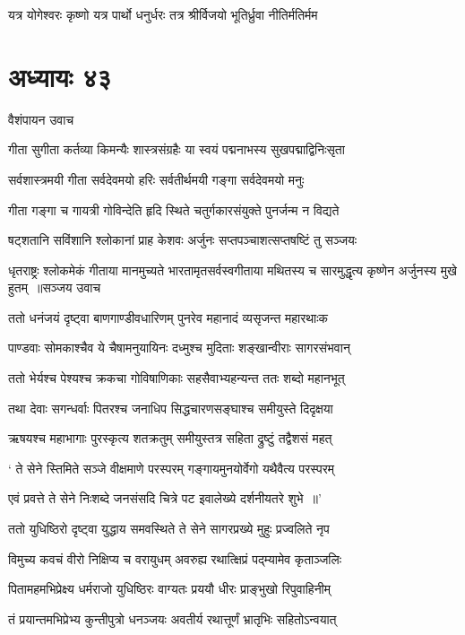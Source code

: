 \twolineshloka
{यत्र योगेश्वरः कृष्णो यत्र पार्थो धनुर्धरः}
{तत्र श्रीर्विजयो भूतिर्ध्रुवा नीतिर्मतिर्मम}


\chapter{अध्यायः ४३}
\twolineshloka
{वैशंपायन उवाच}
{}


\twolineshloka
{गीता सुगीता कर्तव्या किमन्यैः शास्त्रसंग्रहैः}
{या स्वयं पद्मनाभस्य सुखपद्माद्विनिःसृता}


\twolineshloka
{सर्वशास्त्रमयी गीता सर्वदेवमयो हरिः}
{सर्वतीर्थमयी गङ्गा सर्वदेवमयो मनुः}


\twolineshloka
{गीता गङ्गा च गायत्री गोविन्देति हृदि स्थिते}
{चतुर्गकारसंयुक्ते पुनर्जन्म न विद्यते}


\twolineshloka
{षट्शतानि सविंशानि श्लोकानां प्राह केशवः}
{अर्जुनः सप्तपञ्चाशत्सप्तषष्टिं तु सञ्जयः}


\fourlineindentedshloka
{धृतराष्ट्रः श्लोकमेकं गीताया मानमुच्यते}
{भारतामृतसर्वस्वगीताया मथितस्य च}
{सारमुद्धृत्य कृष्णेन अर्जुनस्य मुखे हुतम् ॥सञ्जय उवाच}
{}


\twolineshloka
{ततो धनंजयं दृष्ट्वा बाणगाण्डीवधारिणम्}
{पुनरेव महानादं व्यसृजन्त महारथाःक}


\twolineshloka
{पाण्डवाः सोमकाश्चैव ये चैषामनुयायिनः}
{दध्मुश्च मुदिताः शङ्खान्वीराः सागरसंभवान्}


\twolineshloka
{ततो भेर्यश्च पेश्यश्च क्रकचा गोविषाणिकाः}
{सहसैवाभ्यहन्यन्त ततः शब्दो महानभूत्}


\twolineshloka
{तथा देवाः सगन्धर्वाः पितरश्च जनाधिप}
{सिद्धचारणसङ्घाश्च समीयुस्ते दिदृक्षया}


\twolineshloka
{ऋषयश्च महाभागाः पुरस्कृत्य शतक्रतुम्}
{समीयुस्तत्र सहिता द्रुष्टुं तद्वैशसं महत्}


\twolineshloka
{` ते सेने स्तिमिते सञ्जे वीक्षमाणे परस्परम्}
{गङ्गायमुनयोर्वेगो यथैवैत्य परस्परम्}


\twolineshloka
{एवं प्रवत्ते ते सेने निःशब्दे जनसंसदि}
{चित्रे पट इवालेख्ये दर्शनीयतरे शुभे ॥'}


\twolineshloka
{ततो युधिष्ठिरो दृष्ट्वा युद्धाय समवस्थिते}
{ते सेने सागरप्रख्ये मुहुः प्रज्वलिते नृप}


\twolineshloka
{विमुच्य कवचं वीरो निक्षिप्य च वरायुधम्}
{अवरुह्य रथात्क्षिप्रं पद्म्यामेव कृताञ्जलिः}


\twolineshloka
{पितामहमभिप्रेक्ष्य धर्मराजो युधिष्ठिरः}
{वाग्यतः प्रययौ धीरः प्राङ्भुखो रिपुवाहिनीम्}


\twolineshloka
{तं प्रयान्तमभिप्रेभ्य कुन्तीपुत्रो धनञ्जयः}
{अवतीर्य रथात्तूर्णं भ्रातृभिः सहितोऽन्वयात्}


